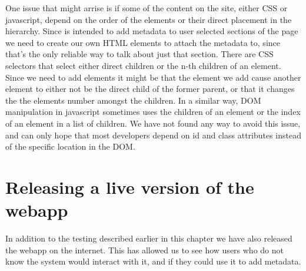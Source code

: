 One issue that might arrise is if some of the content on the site, either CSS or javascript,
depend on the order of the elements or their direct placement in the hierarchy.
Since \theartefact is intended to add metadata to user selected sections of the page we need to create our own
HTML elements to attach the metadata to, since that's the only reliable way to talk about just that section.
There are CSS selectors that select either direct children or the n-th children of an element.
Since we need to add elements it might be that the element we add cause another element to either not be the direct
child of the former parent, or that it changes the the elements number amongst the children.
In a similar way, DOM manipulation in javascript sometimes uses the children of an element or the index of an element
in a list of children.
We have not found any way to avoid this issue,
and can only hope that most developers depend on id and class attributes instead of the specific location in the DOM.

\section{Releasing a live version of the webapp}
In addition to the testing described earlier in this chapter we have also released the webapp on the internet.
This has allowed us to see how users who do not know the system would interact with it,
and if they could use it to add metadata.
